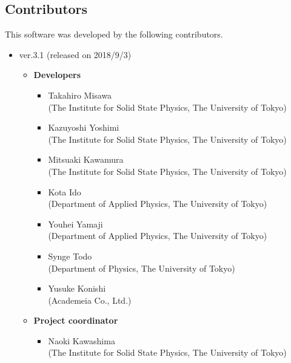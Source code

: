 \subsection{Contributors}
\label{subsec:contributors}
This software was developed by the following contributors.
\begin{itemize}

\item{ver.3.1 (released on 2018/9/3)}
\begin{itemize}
	\item{\bf Developers}
	\begin{itemize}
	\item{Takahiro Misawa \\(The Institute for Solid State Physics, The University of Tokyo)}
	\item{Kazuyoshi Yoshimi\\ (The Institute for Solid State Physics, The University of Tokyo)}
	\item{Mitsuaki Kawamura\\ (The Institute for Solid State Physics, The University of Tokyo)}
	\item{Kota Ido\\ (Department of Applied Physics, The University of Tokyo)}
	\item{Youhei Yamaji\\ (Department of Applied Physics, The University of Tokyo)}
	\item{Synge Todo\\ (Department of Physics, The University of Tokyo)}
	\item{Yusuke Konishi\\ (Academeia Co., Ltd.)}
	\end{itemize}
	\item{\bf Project coordinator}
	\begin{itemize}
	\item{Naoki Kawashima\\ (The Institute for Solid State Physics, The University of Tokyo)}
	\end{itemize}
\end{itemize}



\end{itemize}
